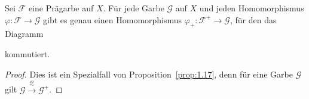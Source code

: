 \begin{kor}
	Sei $\mathcal{F}$ eine Prägarbe auf $X$. Für jede Garbe $\mathcal{G}$ auf $X$ und jeden Homomorphismus $\varphi\colon \mathcal{F} \to \mathcal{G}$ gibt es genau einen Homomorphismus $\varphi_+\colon \mathcal{F}^+ \to \mathcal{G}$, für den das Diagramm
	\begin{center}
	\end{center}
	kommutiert.
	\begin{proof}
		Dies ist ein Spezialfall von Proposition~\ref{prop:1.17}, denn für eine Garbe $\mathcal{G}$ gilt $\mathcal{G} \overset{\overset{\Theta}{\sim}}{\to}\mathcal{G}^+$.
	\end{proof}
\end{kor}
